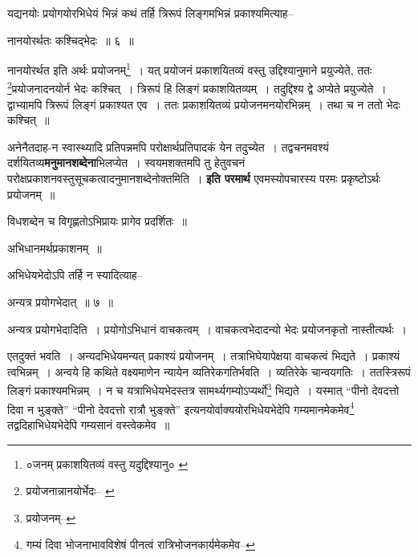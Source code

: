 \documentclass[article,12pt,a4paper]{memoir}
\begin{document}
	  \pstart यद्यनयोः प्रयोगयोरभिधेयं भिन्नं कथं तर्हि त्रिरूपं लिङ्गमभिन्नं प्रकाश्यमित्याह--
	\pend
       
	  \bigskip
	  \begingroup
	

	  \pstart नानयोरर्थतः कश्चिद्भेदः ॥ ६ ॥
	\pend
      
	  \endgroup
	 

	  \pstart नानयोरर्थत इति अर्थः प्रयोजनम्\footnote{०जनम् प्रकाशयितव्यं वस्तु यदुद्दिश्यानु० \cite{dp-msA} \cite{dp-edP} \cite{dp-edH} \cite{dp-edE} \cite{dp-edN}} । यत् प्रयोजनं प्रकाशयितव्यं वस्तु उद्दिश्यानुमाने प्रयुज्येते, ततः \footnote{प्रयोजनान्नानयोर्भेदः--\cite{dp-msB} \cite{dp-msD}}\-प्रयोजनादनयोर्न भेदः कश्चित् । त्रिरूपं हि लिङ्गं प्रकाशयितव्यम् । तदुद्दिश्य द्वे अप्येते प्रयुज्येते । द्वाभ्यामपि त्रिरूपं लिङ्गं प्रकाश्यत एव । ततः प्रकाशयितव्यं प्रयोजनमनयोरभिन्नम् । तथा च न ततो भेदः कश्चित् ॥
	\pend
      
	  \endgroup
	

	  \pstart अनेनैतदाह-न स्वास्थ्यादि प्रतिपन्नमपि परोक्षार्थप्रतिपादकं येन तदुच्येत । तद्वचनमवश्यं दर्शयितव्य\textbf{मनुमानशब्देना}भिलप्येत । स्वयमशक्तमपि तु हेतुवचनं परोक्षप्रकाशनवस्तुसूचकत्वादनुमानशब्देनोक्तमिति । \textbf{इति परमार्थ} एवमस्योपचारस्य परमः प्रकृष्टोऽर्थः प्रयोजनम् ॥
	\pend
      

	  \pstart विधशब्देन च विगृह्णतोऽभिप्रायः प्रागेव प्रदर्शितः ॥
	\pend
      

	  \pstart अभिधानमर्थप्रकाशनम् ॥
	\pend
	  \bigskip
	  \begingroup
	

	  \pstart अभिधेयभेदोऽपि तर्हि न स्यादित्याह--
	\pend
       
	  \bigskip
	  \begingroup
	

	  \pstart अन्यत्र प्रयोगभेदात् ॥ ७ ॥
	\pend
      
	  \endgroup
	 

	  \pstart अन्यत्र प्रयोगभेदादिति । प्रयोगोऽभिधानं वाचकत्वम् । वाचकत्वभेदादन्यो भेदः प्रयोजनकृतो नास्तीत्यर्थः ।
	\pend
       

	  \pstart एतदुक्तं भवति । अन्यदभिधेयमन्यत् प्रकाश्यं प्रयोजनम् । तत्राभिघेयापेक्षया वाचकत्वं भिद्यते । प्रकाश्यं त्वभिन्नम् । अन्वये हि कथिते वक्ष्यमाणेन न्यायेन व्यतिरेकगतिर्भवति । व्यतिरेके चान्वयगतिः । ततस्त्रिरूपं लिङ्गं प्रकाश्यमभिन्नम् । न च यत्राभिधेयभेदस्तत्र सामर्थ्यगम्योऽप्यर्थो\footnote{प्रयोजनम्--\cite{dp-msD-n}} भिद्यते । यस्मात् “पीनो देवदत्तो दिवा न भुङ्क्ते” “पीनो देवदत्तो रात्रौ भुङ्क्ते” इत्यनयोर्वाक्ययोरभिधेयभेदेपि गम्यमानमेकमेव\footnote{गम्यं दिवा भोजनाभावविशेषं पीनत्वं रात्रिभोजनकार्यमेकमेव--\cite{dp-msD-n}} तद्वदिहाभिधेयभेदेपि गम्यसानं वस्त्वेकमेव ॥
	\pend
      
\end{document}
